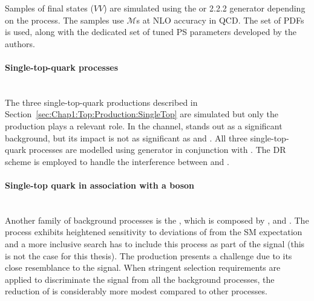 Samples of \diboson final states (\(VV\)) are simulated using the
\SHERPA[2.2.1] or 2.2.2 generator depending on the process.
The samples use  $\mathcal{M}$s at NLO accuracy in QCD.
The \NNPDF[3.0nnlo] set of PDFs is used, along with the %
dedicated set of tuned PS parameters developed by the
\SHERPA authors.



\paragraph{Single-top-quark processes}\mbox{}\\
The three single-top-quark productions described in Section~\ref{sec:Chap1:Top:Production:SingleTop}
are simulated but only the \tW production plays a relevant role.  In the \dilepOStau channel, 
\tW stands out as a significant background, but its impact is not as significant as \ttbar and \Zjets.
All three single-top-quark processes are modelled using \POWHEGBOX[v2]
generator in conjunction with \PYTHIA[8]. %
The DR scheme is employed to handle the interference between \tW and \ttbar. 

\paragraph{Single-top quark in association with a boson}\mbox{}\\
Another family of background processes is the \tX, which is composed
by \tZq, \tWZ and \tWH. %
The \tWH process exhibits heightened sensitivity to deviations of \yt from the SM expectation
and a more inclusive \tH search has to include this process as part of the signal (this is not the case for this thesis).
The \tZq production presents a challenge due to its close resemblance to the \tHq signal.
When stringent selection requirements are applied to 
discriminate the signal from all the background processes, the reduction of \tZq is considerably 
more modest compared to other processes.

